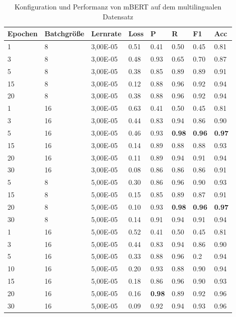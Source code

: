 \documentclass[ngerman]{ttlab-qualify}
\begin{document}
\begin{table}[!ht]
    \centering
    \caption{Konfiguration und Performanz von mBERT auf dem multilingualen Datensatz}
    \begin{tabular}{|l|l|l|l|l|l|l|l|}
    \hline
        \textbf{Epochen} & \textbf{Batchgröße} & \textbf{Lernrate} & \textbf{Loss} & \textbf{P} & \textbf{R} & \textbf{F1} & \textbf{Acc} \\ \hline
        1 & 8 & 3,00E-05 & 0.51 & 0.41 & 0.50 & 0.45 & 0.81 \\ \hline
        3 & 8 & 3,00E-05 & 0.48 & 0.93 & 0.65 & 0.70 & 0.87 \\ \hline
        5 & 8 & 3,00E-05 & 0.38 & 0.85 & 0.89 & 0.89 & 0.91 \\ \hline
        15 & 8 & 3,00E-05 & 0.12 & 0.88 & 0.96 & 0.92 & 0.94 \\ \hline
        20 & 8 & 3,00E-05 & 0.38 & 0.88 & 0.96 & 0.92 & 0.94 \\ \hline
        1 & 16 & 3,00E-05 & 0.63 & 0.41 & 0.50 & 0.45 & 0.81 \\ \hline
        3 & 16 & 3,00E-05 & 0.44 & 0.83 & 0.94 & 0.86 & 0.90 \\ \hline
        5 & 16 & 3,00E-05 & 0.46 & 0.93 & \textbf{0.98} &\textbf{0.96} &\textbf{0.97} \\ \hline
        15 & 16 & 3,00E-05 & 0.14 & 0.89 & 0.88 & 0.88 & 0.93 \\ \hline
        20 & 16 & 3,00E-05 & 0.11 & 0.89 & 0.94 & 0.91 & 0.94 \\ \hline
        30 & 16 & 3,00E-05 & 0.08 & 0.86 & 0.86 & 0.86 & 0.91 \\ \hline
        5 & 8 & 5,00E-05 & 0.30 & 0.86 & 0.96 & 0.90 & 0.93 \\ \hline
        15 & 8 & 5,00E-05 & 0.15 & 0.85 & 0.89 & 0.87 & 0.91 \\ \hline
        20 & 8 & 5,00E-05 & 0.10 & 0.93 & \textbf{0.98} &\textbf{0.96} &\textbf{0.97} \\ \hline
        30 & 8 & 5,00E-05 & 0.14 & 0.91 & 0.94 & 0.91 & 0.94 \\ \hline
        1 & 16 & 5,00E-05 & 0.52 & 0.41 & 0.50 & 0.45 & 0.81 \\ \hline
        3 & 16 & 5,00E-05 & 0.44 & 0.83 & 0.94 & 0.86 & 0.90 \\ \hline
        5 & 16 & 5,00E-05 & 0.33 & 0.88 & 0.96 & 0.2 & 0.94 \\ \hline
        10 & 16 & 5,00E-05 & 0.20 & 0.93 & 0.88 & 0.90 & 0.94 \\ \hline
        15 & 16 & 5,00E-05 & 0.18 & 0.86 & 0.96 & 0.90 & 0.93 \\ \hline
        20 & 16 & 5,00E-05 & 0.16 & \textbf{0.98} & 0.89 & 0.92 & 0.96 \\ \hline
        30 & 16 & 5,00E-05 & 0.09 & 0.92 & 0.94 & 0.93 & 0.96 \\ \hline
    \end{tabular}
\end{table}
\listoffigures %
\listoftables %
\renewcommand{\nomname}{Abkürzungsverzeichnis}
\printnomenclature %
\printbibliography
\end{document}
